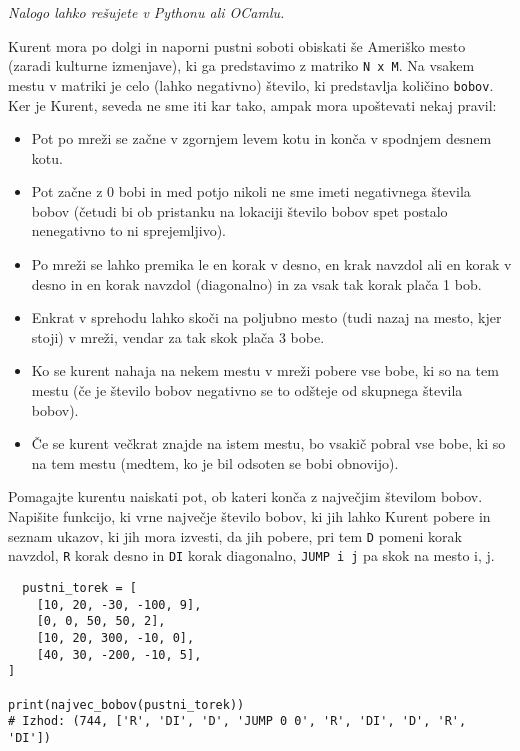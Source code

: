 \documentclass[arhiv]{../izpit}
\begin{document}
\naloga

\emph{Nalogo lahko rešujete v Pythonu ali OCamlu.}

Kurent mora po dolgi in naporni pustni soboti obiskati še Ameriško mesto (zaradi kulturne izmenjave), ki ga predstavimo z matriko \verb|N x M|.
Na vsakem mestu v matriki je celo (lahko negativno) število, ki predstavlja količino \verb|bobov|.
Ker je Kurent, seveda ne sme iti kar tako, ampak mora upoštevati nekaj pravil:
\begin{itemize}
  \item Pot po mreži se začne v zgornjem levem kotu in konča v spodnjem desnem kotu.
  \item Pot začne z 0 bobi in med potjo nikoli ne sme imeti negativnega števila bobov (četudi bi ob pristanku na lokaciji število bobov spet postalo nenegativno to ni sprejemljivo).
  \item Po mreži se lahko premika le en korak v desno, en krak navzdol ali en korak v desno in en korak navzdol (diagonalno) in za vsak tak korak plača 1 bob.
  \item Enkrat v sprehodu lahko skoči na poljubno mesto (tudi nazaj na mesto, kjer stoji) v mreži, vendar za tak skok plača 3 bobe.
  \item Ko se kurent nahaja na nekem mestu v mreži pobere vse bobe, ki so na tem mestu (če je število bobov negativno se to odšteje od skupnega števila bobov).
  \item Če se kurent večkrat znajde na istem mestu, bo vsakič pobral vse bobe, ki so na tem mestu (medtem, ko je bil odsoten se bobi obnovijo).
\end{itemize}

Pomagajte kurentu naiskati pot, ob kateri konča z največjim številom bobov.
Napišite funkcijo, ki vrne največje število bobov, ki jih lahko Kurent pobere in seznam ukazov, ki jih mora izvesti, da jih pobere, pri tem \verb|D| pomeni korak navzdol, \verb|R| korak desno in \verb|DI| korak diagonalno, \verb|JUMP i j| pa skok na mesto i, j.

\begin{verbatim}
  pustni_torek = [
    [10, 20, -30, -100, 9],
    [0, 0, 50, 50, 2],
    [10, 20, 300, -10, 0],
    [40, 30, -200, -10, 5],
]

print(najvec_bobov(pustni_torek))
# Izhod: (744, ['R', 'DI', 'D', 'JUMP 0 0', 'R', 'DI', 'D', 'R', 'DI'])
\end{verbatim}
\end{document}
